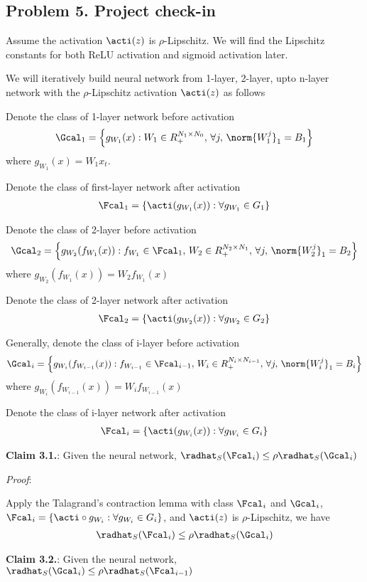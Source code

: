 
\newpage
\subsection*{Problem 5. Project check-in}

Assume the activation $\acti(z)$ is $\rho$-Lipschitz. We will find the Lipschitz constants for both ReLU activation and sigmoid activation later.

We will iteratively build neural network from 1-layer, 2-layer, upto n-layer network with the $\rho$-Lipschitz activation $\acti(z)$ as follows

Denote the class of 1-layer network before activation
\begin{align*}
  \Gcal_1 = \left\{ g_{W_1}(x) : W_1 \in R_{+}^{N_1 \times N_0},\, \forall j,\, \norm{W_1^j}_1 = B_1 \right\}
\end{align*}
where $g_{W_1}(x) = W_1x_t$.

Denote the class of first-layer network after activation
\begin{align*}
  \Fcal_1 = \left\{ \acti(g_{W_1}(x)) : \forall g_{W_1} \in G_1 \right\}
\end{align*}

Denote the class of 2-layer before activation
\begin{align*}
  \Gcal_2 = \left\{ g_{W_2}(f_{W_1}(x)) : f_{W_1} \in \Fcal_1,\, W_2 \in R_{+}^{N_2 \times N_1},\, \forall j,\, \norm{W_2^j}_1 = B_2 \right\}
\end{align*}
where $g_{W_2}(f_{W_1}(x)) = W_2f_{W_1}(x)$

Denote the class of 2-layer network after activation
\begin{align*}
  \Fcal_2 = \left\{ \acti(g_{W_2}(x)) : \forall g_{W_2} \in G_2 \right\}
\end{align*}

Generally, denote the class of i-layer before activation
\begin{align*}
  \Gcal_i = \left\{ g_{W_i}(f_{W_{i-1}}(x)) : f_{W_{i-1}} \in \Fcal_{i-1},\, W_i \in R_{+}^{N_{i} \times N_{i-1}},\, \forall j,\, \norm{W_{i}^j}_1 = B_i \right\}
\end{align*}
where $g_{W_i}(f_{W_{i-1}}(x)) = W_if_{W_{i-1}}(x)$

Denote the class of i-layer network after activation
\begin{align*}
  \Fcal_i = \left\{ \acti(g_{W_i}(x)) : \forall g_{W_i} \in G_i \right\}
\end{align*}

\textbf{Claim 3.1.}: Given the neural network, $\radhat_S(\Fcal_i) \le \rho \radhat_S(\Gcal_i)$

\textit{Proof}:

Apply the Talagrand's contraction lemma with class $\Fcal_i$ and $\Gcal_i$, $\Fcal_i = \left\{ \acti \circ g_{W_i} : \forall g_{W_i} \in G_i \right\}$, and $\acti(z)$ is $\rho$-Lipschitz, we have
\begin{align*}
  \radhat_S(\Fcal_i) \le \rho \radhat_S(\Gcal_i)
\end{align*}

\textbf{Claim 3.2.}: Given the neural network, $\radhat_S(\Gcal_i) \le \rho \radhat_S(\Fcal_{i-1})$
